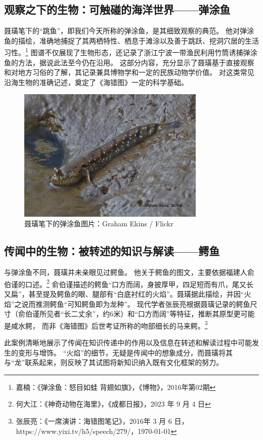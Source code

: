 \documentclass{source/Paper}
\begin{document}
\subsection{观察之下的生物：可触碰的海洋世界——弹涂鱼}
聂璜笔下的“跳鱼”，即我们今天所称的弹涂鱼，是其细致观察的典范。
他对弹涂鱼的描绘，准确地捕捉了其两栖特性、栖息于滩涂以及善于跳跃、挖洞穴居的生活习性。\footnote{嘉楠：《弹涂鱼：怒目如蛙 背翅如旗》，《博物》，2016年第02期}
图谱不仅展现了生物形态，还记录了浙江宁波一带渔民利用竹筒诱捕弹涂鱼的方法，据说此法至今仍在沿用。
这部分内容，充分显示了聂璜基于直接观察和对地方习俗的了解，其记录兼具博物学和一定的民族动物学价值。
对这类常见沿海生物的准确记述，奠定了《海错图》一定的科学基础。
\begin{figure}[H]
    \centering
    \includegraphics[width=0.8\textwidth]{fig/弹涂鱼.jpg}
    \caption{聂璜笔下的弹涂鱼\;图片：Graham Ekins / Flickr}
    \label{fig:弹涂鱼}
\end{figure}
\subsection{传闻中的生物：被转述的知识与解读——鳄鱼}
与弹涂鱼不同，聂璜并未亲眼见过鳄鱼。
他关于鳄鱼的图文，主要依据福建人俞伯谨的口述。\footnote{何大江：《神奇动物在海里》，《成都日报》，2023 年 9 月 4 日}
俞伯谨描述的鳄鱼“口方而阔，身披厚甲，四足短而有爪，尾又长又扁”，甚至提及鳄鱼的眼、腿部有“白底衬红的火焰”。聂璜据此描绘，并因“火焰”之说而推测鳄鱼“可知鳄鱼即为龙种”。
现代学者张辰亮根据聂璜记录的鳄鱼尺寸（俞伯谨所见者“长二丈余”，约6米）和“口方而阔”等特征，推断其原型更可能是咸水鳄，
而非《海错图》后世考证所称的吻部细长的马来鳄。\footnote{张辰亮：《一席演讲：海错图笔记》，2016年 3 月 6 日，https://www.yixi.tv/h5/speech/279/，\today}

此案例清晰地展示了传闻在知识传递中的作用以及信息在转述和解读过程中可能发生的变形与增饰。
“火焰”的细节，无疑是传闻中的想象成分，而聂璜将其与“龙”联系起来，则反映了其试图将新知识纳入既有文化框架的努力。
\end{document}
